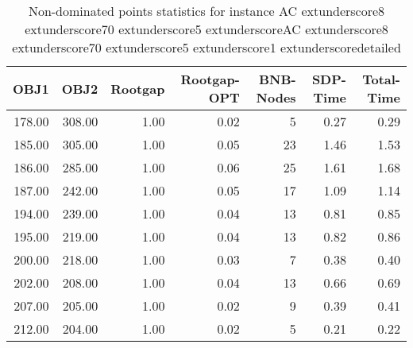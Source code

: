 \begin{table}
\caption{Non-dominated points statistics for instance AC	extunderscore8	extunderscore70	extunderscore5	extunderscoreAC	extunderscore8	extunderscore70	extunderscore5	extunderscore1	extunderscoredetailed}
\label{tab:stats/AC_8_70_5_AC_8_70_5_1_detailed}
\begin{tabular}{rrrrrrr}
\toprule
OBJ1 & OBJ2 & Rootgap & Rootgap-OPT & BNB-Nodes & SDP-Time & Total-Time \\
\midrule
178.00 & 308.00 & 1.00 & 0.02 & 5 & 0.27 & 0.29 \\
185.00 & 305.00 & 1.00 & 0.05 & 23 & 1.46 & 1.53 \\
186.00 & 285.00 & 1.00 & 0.06 & 25 & 1.61 & 1.68 \\
187.00 & 242.00 & 1.00 & 0.05 & 17 & 1.09 & 1.14 \\
194.00 & 239.00 & 1.00 & 0.04 & 13 & 0.81 & 0.85 \\
195.00 & 219.00 & 1.00 & 0.04 & 13 & 0.82 & 0.86 \\
200.00 & 218.00 & 1.00 & 0.03 & 7 & 0.38 & 0.40 \\
202.00 & 208.00 & 1.00 & 0.04 & 13 & 0.66 & 0.69 \\
207.00 & 205.00 & 1.00 & 0.02 & 9 & 0.39 & 0.41 \\
212.00 & 204.00 & 1.00 & 0.02 & 5 & 0.21 & 0.22 \\
\bottomrule
\end{tabular}
\end{table}
